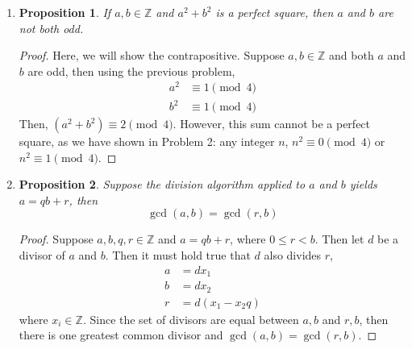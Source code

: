 \documentclass{homework}
\newtheorem*{prop}{Proposition}
\begin{document}
\begin{enumerate}
		\item \begin{minipage}[t]{\linewidth}
				\begin{prop}
					If $a, b \in \mathbb{Z}$ and $a^2 + b^2$ is a perfect square, then $a$ and $b$ are not both odd.
				\end{prop}
				\begin{proof}			
					Here, we will show the contrapositive. Suppose $a, b \in \mathbb{Z}$ and both $a$ and $b$ are odd, then using the previous problem, \begin{align*}
						a^2 & \equiv 1 \pmod{4} \\
						b^2 & \equiv 1 \pmod{4}
					\end{align*}
					Then, $\left( a^2 + b^2 \right) \equiv 2 \pmod{4}$. However, this sum cannot be a perfect square, as we have shown in Problem 2: any integer $n$, $n^2 \equiv 0 \pmod{4}$ or $n^2 \equiv 1 \pmod{4}$. 
				\end{proof}
			\end{minipage}
		
		\item \begin{minipage}[t]{\linewidth}
			\begin{prop}
				Suppose the division algorithm applied to $a$ and $b$ yields $a = qb + r$, then \[ \gcd(a, b) = \gcd(r, b) \]
			\end{prop}
			\begin{proof}			
				Suppose $a, b, q, r \in \mathbb{Z}$ and $a = qb + r$, where $0 \le r < b$. Then let $d$ be a divisor of $a$ and $b$. Then it must hold true that $d$ also divides $r$, \begin{align*}
					a & = d x_1 \\
					b & = d x_2 \\
					r & = d(x_1 - x_2 q)
				\end{align*}
				where $x_i \in \mathbb{Z}$. Since the set of divisors are equal between $a, b$ and $r, b$, then there is one greatest common divisor and $\gcd(a, b) = \gcd(r, b)$.
			\end{proof}
		\end{minipage}	
	\end{enumerate}
\end{document}
